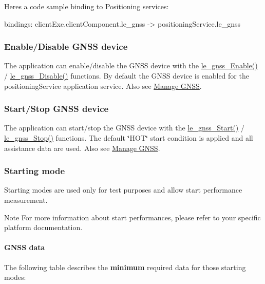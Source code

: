 Here\textquotesingle{}s a code sample binding to Positioning services\+: \begin{DoxyVerb} bindings:
 {
    clientExe.clientComponent.le_gnss -> positioningService.le_gnss
 }\end{DoxyVerb}
\hypertarget{c_gnss_le_gnss_EnableDisable}{}\subsubsection{Enable/\+Disable G\+N\+S\+S device}\label{c_gnss_le_gnss_EnableDisable}
The application can enable/disable the G\+N\+S\+S device with the \hyperlink{le__gnss__interface_8h_a8e1d96b1b64055b298a74cad1acfbbf8}{le\+\_\+gnss\+\_\+\+Enable()} / \hyperlink{le__gnss__interface_8h_aa2cd87c616f968370e9e2113570437ea}{le\+\_\+gnss\+\_\+\+Disable()} functions. By default the G\+N\+S\+S device is enabled for the positioning\+Service application service. Also see \hyperlink{howToGNSS}{Manage G\+N\+S\+S}.\hypertarget{c_gnss_le_gnss_StartStop}{}\subsubsection{Start/\+Stop G\+N\+S\+S device}\label{c_gnss_le_gnss_StartStop}
The application can start/stop the G\+N\+S\+S device with the \hyperlink{le__gnss__interface_8h_add90639835a531c4b9d15554e4f3ba16}{le\+\_\+gnss\+\_\+\+Start()} / \hyperlink{le__gnss__interface_8h_a93d63fdc76dbced071956b87de2abff7}{le\+\_\+gnss\+\_\+\+Stop()} functions. The default \char`\"{}\+H\+O\+T\char`\"{} start condition is applied and all assistance data are used. Also see \hyperlink{howToGNSS}{Manage G\+N\+S\+S}.\hypertarget{c_gnss_le_gnss_StartingMode}{}\subsubsection{Starting mode}\label{c_gnss_le_gnss_StartingMode}
Starting modes are used only for test purposes and allow start performance measurement. \begin{DoxyNote}{Note}
For more information about start performances, please refer to your specific platform documentation.
\end{DoxyNote}
\hypertarget{c_gnss_le_gnss_Data}{}\paragraph{G\+N\+S\+S data}\label{c_gnss_le_gnss_Data}
The following table describes the {\bfseries minimum} required data for those starting modes\+:

